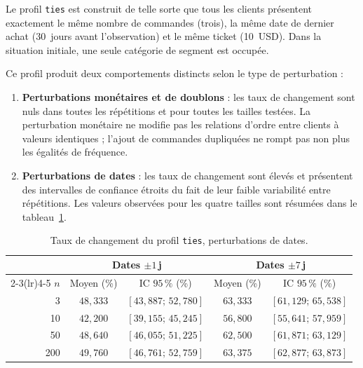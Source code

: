 Le profil \texttt{ties} est construit de telle sorte que tous les clients présentent
exactement le même nombre de commandes (trois), la même date de dernier achat (30~jours
avant l'observation) et le même ticket (10~USD). Dans la situation initiale, une seule
catégorie de segment est occupée.

Ce profil produit deux comportements distincts selon le type de perturbation :

\begin{enumerate}
  \item \textbf{Perturbations monétaires et de doublons} : les taux de changement sont nuls
    dans toutes les répétitions et pour toutes les tailles testées. La perturbation monétaire
    ne modifie pas les relations d'ordre entre clients à valeurs identiques ; l'ajout de
    commandes dupliquées ne rompt pas non plus les égalités de fréquence.

  \item \textbf{Perturbations de dates} : les taux de changement sont élevés et présentent
    des intervalles de confiance étroits du fait de leur faible variabilité entre répétitions.
    Les valeurs observées pour les quatre tailles sont résumées dans le
    tableau~\ref{tab:resultats-ties-dates}.
\end{enumerate}

\begin{table}[htb]
  \centering
  \caption{Taux de changement du profil \texttt{ties}, perturbations de dates.}
  \label{tab:resultats-ties-dates}
  \begin{tabular}{rcccc}
    \toprule
    & \multicolumn{2}{c}{Dates $\pm1$\,j} & \multicolumn{2}{c}{Dates $\pm7$\,j} \\
    \cmidrule(lr){2-3}\cmidrule(lr){4-5}
    $n$ & Moyen (\%) & IC $95\,\%$ (\%) & Moyen (\%) & IC $95\,\%$ (\%) \\
    \midrule
    3   & $48{,}333$ & $[43{,}887;\,52{,}780]$ & $63{,}333$ & $[61{,}129;\,65{,}538]$ \\
    10  & $42{,}200$ & $[39{,}155;\,45{,}245]$ & $56{,}800$ & $[55{,}641;\,57{,}959]$ \\
    50  & $48{,}640$ & $[46{,}055;\,51{,}225]$ & $62{,}500$ & $[61{,}871;\,63{,}129]$ \\
    200 & $49{,}760$ & $[46{,}761;\,52{,}759]$ & $63{,}375$ & $[62{,}877;\,63{,}873]$ \\
    \bottomrule
  \end{tabular}
\end{table}

